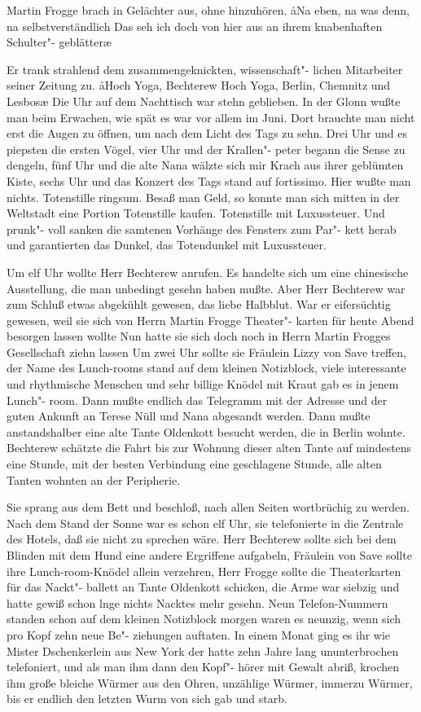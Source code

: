 Martin Frogge brach in Gelächter aus, ohne hinzuhören.
\aa{}Na eben, na was denn, na selbstverständlich\ausr{} Das seh
ich doch von hier aus an ihrem knabenhaften Schulter"-%
geblätter\ausr{}\ae{}

Er trank strahlend dem zusammengeknickten, wissenschaft"-%
lichen Mitarbeiter seiner Zeitung zu. \aa{}Hoch Yoga, Bechterew\ausr{}
Hoch Yoga, Berlin, Chemnitz und Lesbos\ausr{}\ae{}
\abstand{}
Die Uhr auf dem Nachttisch war stehn geblieben. In der
Glonn wußte man beim Erwachen, wie spät es war vor
allem im Juni. Dort brauchte man nicht erst die Augen zu
öffnen, um nach dem Licht des Tags zu sehn. Drei Uhr
und es piepsten die ersten Vögel, vier Uhr und der Krallen"-%
peter begann die Sense zu dengeln, fünf Uhr und die alte
Nana wälzte sich mir Krach aus ihrer geblümten Kiste, sechs
Uhr und das Konzert des Tags stand auf fortissimo. Hier
wußte man nichts. Totenstille ringsum. Besaß man Geld,
so konnte man sich mitten in der Weltstadt eine Portion
Totenstille kaufen. Totenstille mit Luxussteuer. Und prunk"-%
voll sanken die samtenen Vorhänge des Fensters zum Par"-%
kett herab und garantierten das Dunkel, das Totendunkel
mit Luxussteuer.

Um elf Uhr wollte Herr Bechterew anrufen. Es handelte
sich um eine chinesische Ausstellung, die man unbedingt gesehn
haben mußte. Aber Herr Bechterew war zum Schluß etwas
abgekühlt gewesen, das liebe Halbblut. War er eifersüchtig
gewesen, weil sie sich von Herrn Martin Frogge Theater"-%
karten für heute Abend besorgen lassen wollte\frag{} Nun hatte
sie sich doch noch in Herrn Martin Frogges Gesellschaft ziehn
lassen\ausr{} Um zwei Uhr sollte sie Fräulein Lizzy von Save
treffen, der Name des Lunch-rooms stand auf dem kleinen
Notizblock, viele interessante und rhythmische Menschen und
sehr billige Knödel mit Kraut gab es in jenem Lunch"-%
room. Dann mußte endlich das Telegramm mit der Adresse
und der guten Ankunft an Terese Nüll und Nana abgesandt
werden. Dann mußte anstandshalber eine alte Tante
Oldenkott besucht werden, die in Berlin wohnte. Bechterew
schätzte die Fahrt bis zur Wohnung dieser alten Tante auf
mindestens eine Stunde, mit der besten Verbindung eine
geschlagene Stunde, alle alten Tanten wohnten an der
Peripherie.

Sie sprang aus dem Bett und beschloß, nach allen Seiten
wortbrüchig zu werden. Nach dem Stand der Sonne war es
schon elf Uhr, sie telefonierte in die Zentrale des Hotels, daß
sie nicht zu sprechen wäre. Herr Bechterew sollte sich bei dem
Blinden mit dem Hund eine andere Ergriffene aufgabeln,
Fräulein von Save sollte ihre Lunch-room-Knödel allein
verzehren, Herr Frogge sollte die Theaterkarten für das Nackt"-%
ballett an Tante Oldenkott schicken, die Arme war siebzig und
hatte gewiß schon lnge nichts Nacktes mehr gesehn. Neun
Telefon-Nummern standen schon auf dem kleinen Notizblock\dopp{}
morgen waren es neunzig, wenn sich pro Kopf zehn neue Be"-%
ziehungen auftaten. In einem Monat ging es ihr wie Mister
Dschenkerlein aus New York\dopp{} der hatte zehn Jahre lang
ununterbrochen telefoniert, und als man ihm dann den Kopf"-%
hörer mit Gewalt abriß, krochen ihm große bleiche Würmer
aus den Ohren, unzählige Würmer, immerzu Würmer, bis
er endlich den letzten Wurm von sich gab und starb.

